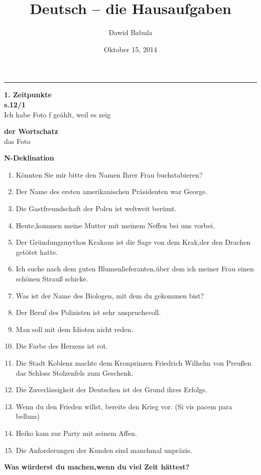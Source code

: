 \documentclass[a4paper,12pt]{article}
\author{Dawid Babula}
\title{Deutsch -- die Hausaufgaben}
\date{Oktober 15, 2014}
\makeatletter
\def\thickhrulefill{\leavevmode \leaders \hrule height 1pt\hfill \kern \z@}
\def\maketitle{%
    \null
    \thispagestyle{empty}%
    \vfill
    \begin{center}\leavevmode
    \normalfont
    {\LARGE\raggedleft \@author\par}%
    \thickhrulefill\par
    {\huge\raggedright \@title\par}%
    \vskip 1cm
    \end{center}%
    \vfill
    {\Large \@date\par}%
    \null
    \cleardoublepage
    }
\makeatother
\begin{document}
\maketitle

\textbf{\Large 1. Zeitpunkte}
\vspace{1pc}
\\{}
\textbf{\normalsize s.12/1}
\\{}
Ich habe Foto f ge\"ahlt, weil es zeig


\vspace{1pc}
\textbf{\Large der Wortschatz}
\\{}
das Foto
\newpage

\textbf{\large N-Deklination}
\vspace{2pc}
\begin{enumerate}
    \item K\"onnten Sie mir bitte den Namen Ihrer Frau buchstabieren?
    \item Der Name des ersten amerikanischen Pr\"asidenten war George.
    \item Die Gastfreundschaft der Polen ist weltweit ber\"umt.
    \item Heute,kommen meine Mutter mit meinem Neffen bei uns vorbei.
    \item Der Gr\"undungsmythos Krakaus ist die Sage von dem Krak,der den Drachen get\"otet hatte.
    \item Ich suche nach dem guten Blumenlieferanten,\"uber dem ich meiner Frau einen sch\"onen Strau{\ss} schicke.
    \item Was ist der Name des Biologen, mit dem du gekommen bist?
    \item Der Beruf des Polizisten ist sehr anspruchsvoll.
    \item Man soll mit dem Idioten nicht reden.
    \item Die Farbe des Herzens ist rot.
    \item Die Stadt Koblenz machte dem Kronprinzen Friedrich Wilhelm von Preu{\ss}en das Schloss Stolzenfels zum Geschenk.
    \item Die Zuverl\"assigkeit der Deutschen ist der Grund ihres Erfolgs.
    \item Wenn du den Frieden willst, bereite den Krieg vor. (Si vis pacem para bellum)
    \item Heiko kam zur Party mit seinem Affen.
    \item Die Anforderungen der Kunden sind manchmal unpr\"azis.
\end{enumerate}
\newpage
\textbf{\large Was w\"urderst du machen,wenn du viel Zeit h\"attest?}
\end{document}
